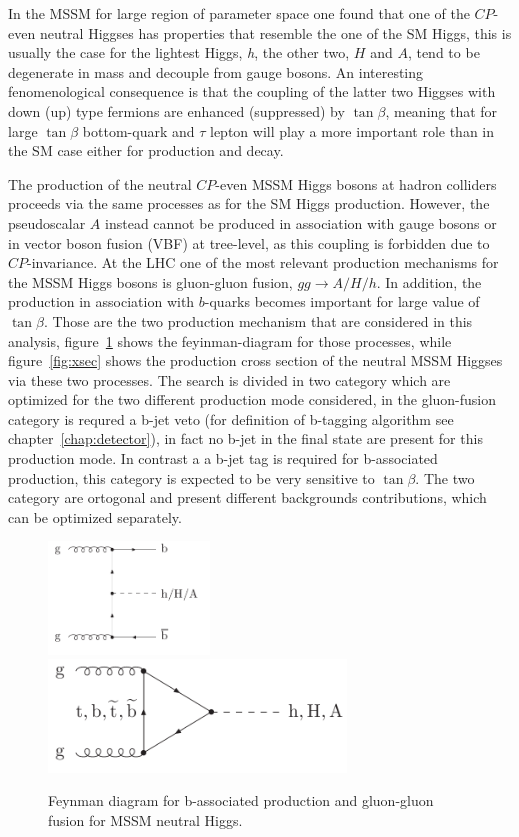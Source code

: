 In the MSSM for large region of parameter space one found that one of the 
$CP$-even neutral Higgses  has properties that resemble the one of the SM Higgs,
this is usually the case for the lightest Higgs, \emph{h}, the other two, $H$ and $A$, 
tend to be degenerate in mass and decouple from gauge bosons.
An interesting fenomenological consequence is that the coupling of the latter
two Higgses with down (up) type fermions are enhanced
(suppressed) by $\tan\beta$, meaning that for large $\tan\beta$
bottom-quark and $\tau$ lepton will play a more important role than in
the SM case either for production and decay.

The production of the neutral $CP$-even MSSM Higgs bosons at hadron
colliders proceeds via the same processes as for the SM Higgs
production. However, the pseudoscalar $A$ instead cannot be produced
in association with gauge bosons or in vector boson fusion (VBF) at
tree-level, as this coupling is forbidden due to $CP$-invariance.  At
the LHC one of the most relevant production mechanisms for the MSSM
Higgs bosons is gluon-gluon fusion, $gg\rightarrow A/H/h$. In
addition, the production in association with $b$-quarks becomes
important for large value of $\tan\beta$. Those are the two production mechanism
that are considered in this analysis, figure~\ref{fig:prod} shows the feyinman-diagram
for those processes, while figure~\ref{fig:xsec} shows the production cross section of the neutral 
MSSM Higgses via these two processes. The search is divided in two category which are optimized
for the two different production mode considered, in the gluon-fusion category
is requred a b-jet veto (for definition of b-tagging algorithm see chapter~\ref{chap:detector}), in fact no b-jet in the final state are present for this
production mode. In contrast a a b-jet tag is required for b-associated production,
this category is expected to be very sensitive to $\tan\beta$. The two category are
ortogonal and present different backgrounds contributions, which can be
optimized separately. 

\begin{figure}[tp]
     \begin{center}

            \includegraphics[height=3cm]{figure/bba.png}
            \includegraphics[height=3cm]{figure/ggf.png}

    \end{center}
    \caption{Feynman diagram for b-associated production and gluon-gluon fusion for MSSM neutral Higgs.}
   \label{fig:prod}
\end{figure}

